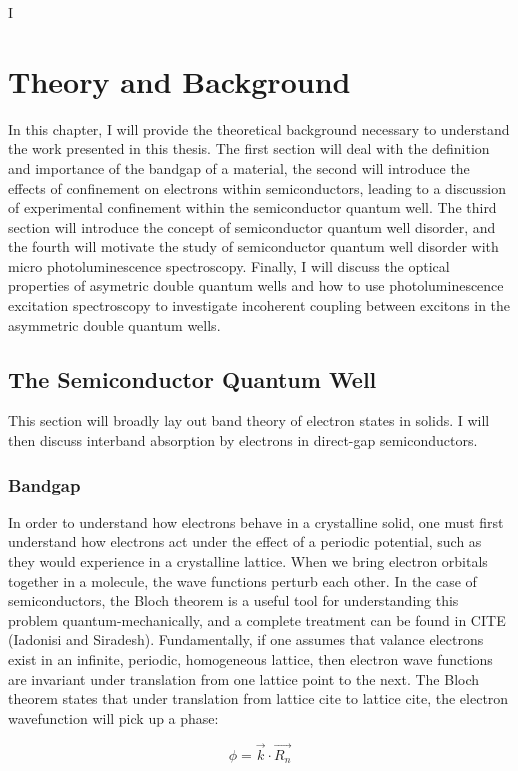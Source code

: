 I\chapter{Theory and Background}
In this chapter, I will provide the theoretical background necessary to understand the work presented in this thesis. The first section will deal with the definition and importance of the bandgap of a material, the second will introduce the effects of confinement on electrons within semiconductors, leading to a discussion of experimental confinement within the semiconductor quantum well. The third section will introduce the concept of semiconductor quantum well disorder, and the fourth will motivate the study of semiconductor quantum well disorder with micro photoluminescence spectroscopy. Finally, I will discuss the optical properties of asymetric double quantum wells and how to use photoluminescence excitation spectroscopy to investigate incoherent coupling between excitons in the asymmetric double quantum wells.

\section{The Semiconductor Quantum Well}
This section will broadly lay out band theory of electron states in solids. I will then discuss interband absorption by electrons in direct-gap semiconductors. 
\subsection{Bandgap}

\indent In order to understand how electrons behave in a crystalline solid, one must first understand how electrons act under the effect of a periodic potential, such as they would experience in a crystalline lattice. When we bring electron orbitals together in a molecule, the wave functions perturb each other. In the case of semiconductors, the Bloch theorem is a useful tool for understanding this problem quantum-mechanically, and a complete treatment can be found in CITE (Iadonisi and Siradesh). Fundamentally, if one assumes that valance electrons exist in an infinite, periodic, homogeneous lattice, then electron wave functions are invariant under translation from one lattice point to the next. The Bloch theorem states that under translation from lattice cite to lattice cite, the electron wavefunction will pick up a phase:

\begin{equation}
\phi = \vec{k}\cdot \vec{R_n}
\end{equation}
 
